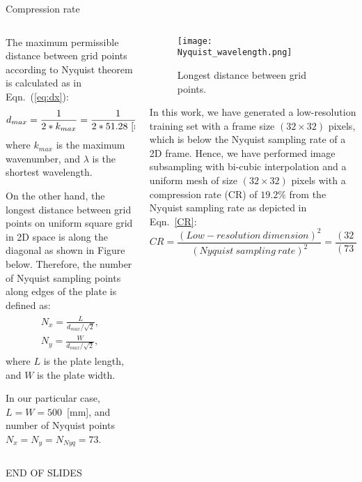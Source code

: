 \documentclass[10pt,aspectratio=169,dvipsnames]{beamer} %
\begin{document}
	\begin{frame}{Compression rate}
		\begin{columns}[T]
			\begin{column}[t]{0.48\textwidth}
				\tiny
				The maximum permissible distance between grid points according to Nyquist theorem is calculated as in Eqn.~(\ref{eq:dx}):
				\begin{equation}
					d_{max}= \frac{1}{2*k_{max}} = \frac{1}{2*51.28\ [\textup{m}]} = \frac{\lambda}{2} = \frac{19.5}{2}\ \textup{[mm]}.
					\label{eq:dx}	
				\end{equation} 
				where $k_{max}$ is the maximum wavenumber, and $\lambda$ is the shortest wavelength.
				
				On the other hand, the longest distance between grid points on uniform square grid in 2D space is along the diagonal as shown in Figure below.
				Therefore, the number of Nyquist sampling points along edges of the plate is defined as:
				\begin{align}
					\begin{split}
						N_x= \frac{L}{d_{max}/\sqrt{2}}, \\
						N_y=  \frac{W}{d_{max}/\sqrt{2}},
					\end{split}
					\label{eq:Nyq}
				\end{align}
				where $L$ is the plate length, and $W$ is the plate width.
				
				In our particular case, $L=W=500$~[mm], and number of Nyquist points $N_x= N_y= N_{Nyq} =73$.				
			\end{column}
			\begin{column}[t]{0.48\textwidth}
				\tiny
				\begin{figure} [!h]
					\centering
					\texttt{[image: Nyquist\_wavelength.png]}
					\caption{Longest distance between grid points.}
				\end{figure}
				
				In this work, we have generated a low-resolution training set with a frame size \((32\times32)\) pixels, which is below the Nyquist sampling rate of a 2D frame.
				Hence, we have performed image subsampling with bi-cubic interpolation and a uniform mesh of size \((32\times32)\) pixels with a compression rate (CR) of \(19.2\%\) from the Nyquist sampling rate as depicted in Eqn.~\ref{CR}:
				\begin{equation}
					CR = \frac{(Low-resolution\ dimension)^2}{(Nyquist\ sampling\ rate)^2} = \frac{(32\times32)}{(73\times73)}=19.2\%
					\label{CR}
				\end{equation}			
			\end{column}
		\end{columns}	
	\end{frame}
		 END OF SLIDES
\end{document}
